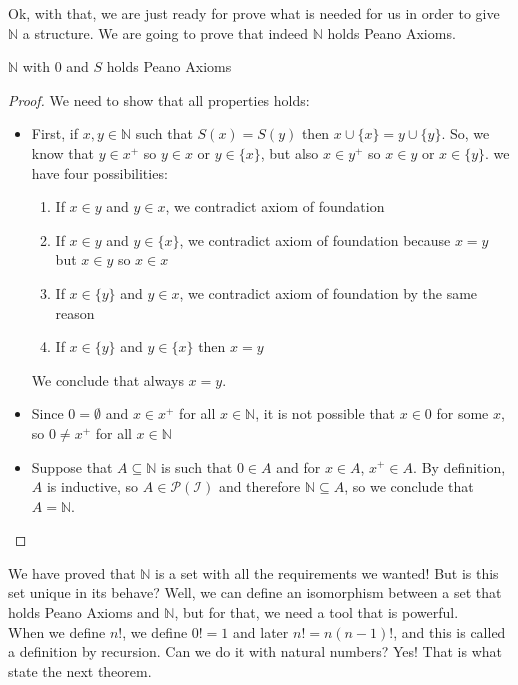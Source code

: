 \documentclass{tufte-handout}
\begin{document}
Ok, with that, we are just ready for prove what is needed for us in order to give $\mathbb{N}$ a structure. We are going to prove that indeed $\mathbb{N}$ holds Peano Axioms.

\begin{theorem}
	$\mathbb{N}$ with $0$ and $S$ holds Peano Axioms
\end{theorem}
\begin{proof}
	We need to show that all properties holds:
	\begin{itemize}
		\item First, if $x, y \in \mathbb{N}$ such that $S(x) = S(y)$ then $x \cup \{x\} = y \cup \{y\}$. So, we know that $y\in x^+$ so $y \in x$ or $y \in \{x\}$, but also $x \in y^+$ so $x \in y$ or $x \in \{y\}$. we have four possibilities:
		\begin{enumerate}
			\item If $x \in y$ and $y \in x$, we contradict axiom of foundation
			\item If $x \in y$ and $y \in \{x\}$, we contradict axiom of foundation because $x = y$ but $x \in y$ so $x \in x$
			\item If $x \in \{y\}$ and $y \in x$, we contradict axiom of foundation by the same reason
			\item If $x \in \{y\}$ and $y \in \{x\}$ then $x = y$
		\end{enumerate}
		We conclude that always $x = y$.
		\item Since $0 = \emptyset$ and $x \in x^+$ for all $x \in \mathbb{N}$, it is not possible that $x \in 0$ for some $x$, so $0 \neq x^+$ for all $x \in \mathbb{N}$
		\item Suppose that $A \subseteq \mathbb{N}$ is such that $0 \in A$ and for $x \in A$, $x^+ \in A$. By definition, $A$ is inductive, so $A \in \mathcal{P(\mathcal{I})}$ and therefore $\mathbb{N} \subseteq A$, so we conclude that $A = \mathbb{N}$.
	\end{itemize}
\end{proof}

We have proved that $\mathbb{N}$ is a set with all the requirements we wanted! But is this set unique in its behave? Well, we can define an isomorphism between a set that holds Peano Axioms and $\mathbb{N}$, but for that, we need a tool that is powerful.\\

When we define $n!$, we define $0! =1$ and later $n! = n(n-1)!$, and this is called a definition by recursion. Can we do it with natural numbers? Yes! That is what state the next theorem.
\end{document}
